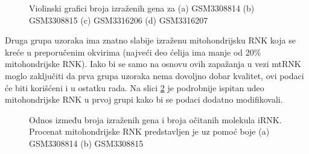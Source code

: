 \documentclass{article}
\begin{document}
\begin{figure}[!h]
    \centering
    \caption{ Violinski grafici broja izraženih gena za (a) GSM3308814 (b) GSM3308815 (c) GSM3316206 (d) GSM3316207}
    \label{fig:n_counts_violin}
\end{figure}

Druga grupa uzoraka ima znatno slabije izraženu mitohondrijsku RNK koja se kreće u preporučenim okvirima (najveći deo ćelija ima manje od 20\% mitohondrijske RNK). Iako bi se samo na osnovu ovih zapažanja u vezi mtRNK moglo zaključiti da prva grupa uzoraka nema dovoljno dobar kvalitet, ovi podaci će biti korišćeni i u ostatku rada. Na slici \ref{fig:odnos} je podrobnije ispitan udeo mitohondrijske RNK u prvoj grupi kako bi se podaci dodatno modifikovali.

\begin{figure}[!h]
    \centering
    \caption{ Odnos između broja izraženih gena i broja očitanih molekula iRNK. Procenat mitohondrijske RNK predstavljen je uz pomoć boje (a) GSM3308814 (b) GSM3308815 }
    \label{fig:odnos}
\end{figure}
\end{document}
